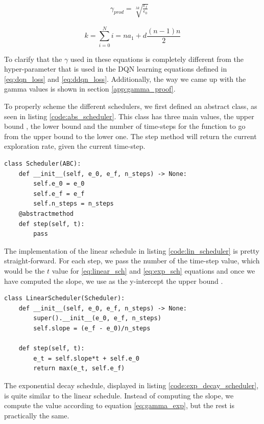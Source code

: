 \begin{align}
	\gamma_{prod} = \sqrt[\lambda k]{\frac{\epsilon_f}{\epsilon_0}} \quad \label{eq:gamma_pexp}
\end{align}

\begin{equation}
	\label{eq:k_sum}
	k = \sum_{i=0}^{N} i  = n a_1 + d \frac{(n-1)n}{2}
\end{equation}

To clarify that the $\gamma$ used in these equations is completely different from the hyper-parameter that is used in the DQN learning equations defined in \ref{eq:dqn_loss} and \ref{eq:ddqn_loss}. Additionally, the way we came up with the gamma values is shown in section \ref{app:gamma_proof}.

To properly scheme the different schedulers, we first defined an abstract class, as seen in listing \ref{code:abs_scheduler}. This class has three main values, the upper bound , the lower bound  and the number of time-steps for the function to go from the upper bound to the lower one. The step method will return the current exploration rate, given the current time-step.
\begin{lstlisting}[caption={Abstract class for the scheduler}, label={code:abs_scheduler}]
class Scheduler(ABC):
	def __init__(self, e_0, e_f, n_steps) -> None:
		self.e_0 = e_0
		self.e_f = e_f
		self.n_steps = n_steps
	@abstractmethod
	def step(self, t):
		pass
\end{lstlisting}

The implementation of the linear schedule in listing \ref{code:lin_scheduler} is pretty straight-forward. For each step, we pass the number of the time-step value, which would be the $t$ value for \ref{eq:linear_sch} and \ref{eq:exp_sch} equations and once we have computed the slope, we use as the y-intercept the upper bound . 

\begin{lstlisting}[caption={Linear scheduler class}, label={code:lin_scheduler}]
class LinearScheduler(Scheduler):
	def __init__(self, e_0, e_f, n_steps) -> None:
		super().__init__(e_0, e_f, n_steps)
		self.slope = (e_f - e_0)/n_steps
	
	def step(self, t):
		e_t = self.slope*t + self.e_0
		return max(e_t, self.e_f)
\end{lstlisting}

The exponential decay schedule, displayed in listing \ref{code:exp_decay_scheduler}, is quite similar to the linear schedule. Instead of computing the slope, we compute the  value according to equation \ref{eq:gamma_exp}, but the rest is practically the same.

